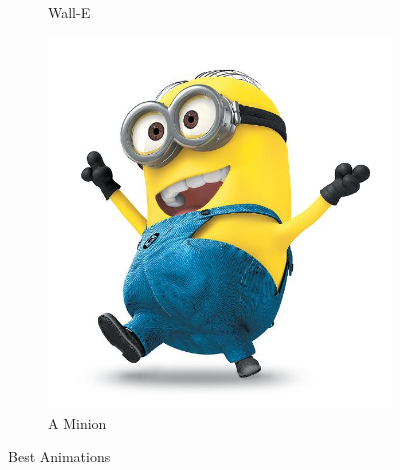 \documentclass{report}
\begin{document}
\begin{landscape}
\begin{figure}
\begin{subfigure}[b]{0.5\textwidth}
    \caption{Wall-E}
    \label{fig:WallE}
  \end{subfigure}             
  \begin{subfigure}[b]{0.5\textwidth}
    \includegraphics[width=\textwidth]{Pictures/minion.jpg}
    \caption{A Minion}
    \label{fig:Minnion}
  \end{subfigure}
  \caption{Best Animations}
  \label{fig:animations}
\end{figure}

\end{landscape}
\end{document}
